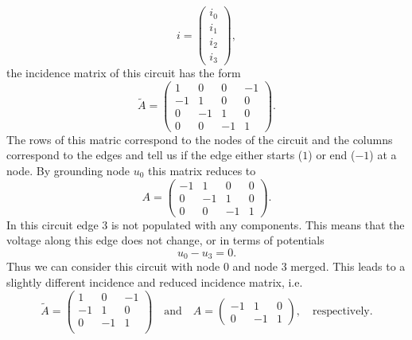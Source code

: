 \begin{example}
\begin{displaymath}
		i=
		\left(
		\begin{matrix}
			i_0 \\
			i_1 \\
			i_2 \\
			i_3 
		\end{matrix}
		\right),
	\end{displaymath}
	the incidence matrix of this circuit has the form
	\begin{displaymath}
		\tilde{A} = 
		\left(
		\begin{matrix}
			1 & 0 & 0 & -1 \\
			-1 & 1 & 0 & 0 \\
			0 & -1 & 1 & 0 \\
			0 & 0 & -1 & 1 
		\end{matrix}
		\right).
	\end{displaymath}
	The rows of this matric correspond to the nodes of the circuit and the columns correspond to the edges and tell us if the edge either starts ($1$) or end ($-1$) at a node. By grounding node $u_0$ this matrix reduces to
	\begin{displaymath}
		A = 
		\left(
		\begin{matrix}
			-1 & 1 & 0 & 0 \\
			0 & -1 & 1 & 0 \\
			0 & 0 & -1 & 1 
		\end{matrix}
		\right).
	\end{displaymath}
	In this circuit edge 3 is not populated with any components. This means that the voltage along this edge does not change, or in terms of potentials
	\begin{displaymath}
		u_0 - u_3 = 0.
	\end{displaymath}
	Thus we can consider this circuit with node 0 and node 3 merged. This leads to a slightly different incidence and reduced incidence matrix, i.e.
	\begin{displaymath}
		\tilde{A} = 
		\left(
		\begin{matrix}
			1 & 0 & -1 \\
			-1 & 1 & 0 \\
			0 & -1 & 1 \\
		\end{matrix}
		\right) \quad \text{and} \quad
		A = 
		\left(
		\begin{matrix}
			-1 & 1 & 0 \\
			0 & -1 & 1 
		\end{matrix}
		\right), \quad \text{respectively.}
	\end{displaymath}
\end{example}

